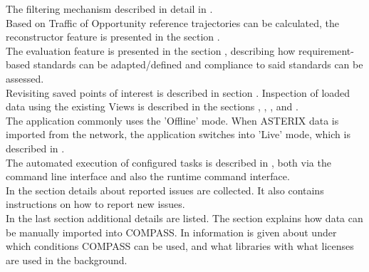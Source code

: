 The filtering mechanism described in detail in . \\

Based on Traffic of Opportunity reference trajectories can be calculated, the reconstructor feature is presented in the section . \\

The evaluation feature is presented in the section , describing how requirement-based standards can be adapted/defined and compliance to said standards can be assessed. \\

Revisiting saved points of interest is described in section . Inspection of loaded data using the existing Views is described in the sections , , ,  and . \\

The application commonly uses the 'Offline' mode. When ASTERIX data is imported from the network, the application switches into 'Live' mode, which is described in . \\

The automated execution of configured tasks is described in , both via the command line interface and also the runtime command interface. \\

In the section  details about reported issues are collected. It also contains instructions on how to report new issues. \\

In the last section  additional details are listed. 
The section  explains how data can be manually imported into COMPASS. 
In  information is given about under which conditions COMPASS can be used, and what libraries with what licenses are used in the background.

\pagebreak










